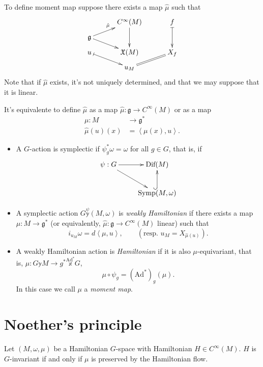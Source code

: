 \noindent
To define moment map suppose there exists a map $\hat{\mu}$ 
such that
$$
\xymatrixcolsep{3em}
\xymatrixrowsep{.7em}
\xymatrix{
&C^\infty(M)\ar[dd]&f\ar@{|->}[dd]\\
\mathfrak{g}\ar[dr]\ar[ur]^{\hat{\mu}}\\
u \ar@{|->}[dr] & \mathfrak{X}(M) & X_f\\
& u_M \ar@{=}[ur]
}
$$
Note that if  $\hat{\mu}$ exists, it's not uniquely determined,
and that we may suppose that it is linear.

It's equivalente to define $\hat{\mu}$ as a map 
$\hat{\mu}:\mathfrak{g}\to C^\infty(M)$ or as a map
\begin{align*}
\mu: M &\longrightarrow \mathfrak{g}^* \\
\hat{\mu}(u)(x) &= \left<\mu(x),u\right>.
\end{align*}

\begin{definition}
\label{definition-symplectic-and-hamiltonian-actions}
\begin{itemize}
\item A $G$-action is symplectic if $\psi_g^*\omega=\omega$ for all $g \in G$,
that is, if
$$
\xymatrix{
\psi:G\ar[r]\ar[dr]&\text{Dif}(M)\\
&\text{Symp}(M,\omega)\ar@{^{(}->}[u].
}
$$

\item A symplectic action $G \overset{\psi}{\mathbb{y}}(M,\omega)$
is {\it weakly Hamiltonian} if there exists a map $\mu:M \to \mathfrak{g}^*$ 
(or equivalently, $\hat{\mu}:\mathfrak{g} \to C^\infty(M)$ linear)
such that
$$
i_{u_M}\omega=d\left<\mu,u\right>,\qquad (\text{resp. } u_M=X_{\hat{\mu}(u)}).
$$

\item A weakly Hamiltonian action is {\it Hamiltonian} if it is also
$\mu$-equivariant, that is,
$\mu: G\mathbb{y} M \to g^*\overset{\text{Ad}^*}{\mathbb{x}}G$,
$$
\mu \circ \psi_g=(\text{Ad}^*)_g(\mu).
$$
In this case we call $\mu$ a {\it moment map}.
\end{itemize}

\end{definition}

\section{Noether's principle}
\label{section-Noether-principle}

\begin{theorem}
\label{theorem-Noether-principle}
Let $(M,\omega,\mu)$ be a Hamiltonian $G$-space with Hamiltonian
$H\in C^\infty(M)$. $H$ is $G$-invariant if and only if $\mu$ is preserved by
the Hamiltonian flow.
\end{theorem}

